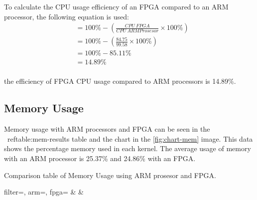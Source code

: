 To calculate the CPU usage efficiency of an FPGA compared to an ARM processor, the following equation is used:
\begin{equation*}
    \begin{split}
& = 100\% - \left( \frac{CPU\ FPGA}{CPU\ ARM Prosesor} \times 100\% \right) \\
& = 100\% - \left( \frac{84.75}{99.58} \times 100\% \right) \\
& = 100\% - 85.11\% \\
& = 14.89\% \\
    \end{split}
\end{equation*}

the efficiency of FPGA CPU usage compared to ARM processors is 14.89\%.


\subsection{Memory Usage}


Memory usage with ARM processors and FPGA can be seen in the \ ref{table:mem-results} table and the chart in the \ref{fig:chart-mem} image. This data shows the percentage memory used in each kernel. The average usage of memory with an ARM processor is 25.37\% and 24.86\% with an FPGA.

\begin{atable}
    \caption{Comparison table of Memory Usage using ARM prosesor and FPGA.}
    \label{table:hasil-mem}
        {
            filter=\filter, 
            arm=\arm, 
            fpga=\fpga}
        {
            \filter & 
            \arm & 
            \fpga }
\end{atable}

